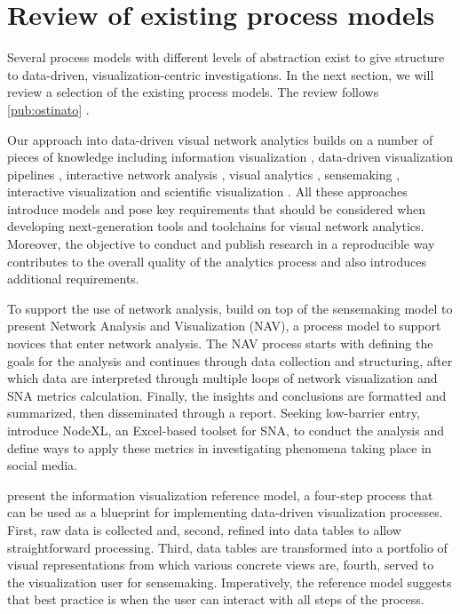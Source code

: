 \section{Review of existing process models}

Several process models with different levels of abstraction exist to give structure to data-driven, visualization-centric investigations. In the next section, we will review a selection of the existing process models. The review follows \ref{pub:ostinato} \citep{Huhtamaki2015Ostinato:Analytics}.

Our approach into data-driven visual network analytics builds on a number of pieces of knowledge including 
information visualization \citep{Card1999ReadingsThink}, 
data-driven visualization pipelines \citep{Nykanen2008}, 
interactive network analysis \citep{Hansen2012DoData},
visual analytics \citep{Wong2004VisualAnalytics},
sensemaking \citep{Pirolli2005TheAnalysis, Weick2005OrganizingSensemaking},
interactive visualization \citep{Heer2012InteractiveAnalysis} and 
scientific visualization \citep{Telea2008}. All these approaches introduce models and pose key requirements that should be considered when developing next-generation tools and toolchains for visual network analytics. Moreover, the objective to conduct and publish research in a reproducible way \citep{Peng2009,Peng2011, Ghosh2013} contributes to the overall quality of the analytics process and also introduces additional requirements.

To support the use of network analysis, \cite{Hansen2012DoData} build on top of the sensemaking model \citep{Pirolli2005TheAnalysis} to present Network Analysis and Visualization (NAV), a process model to support novices that enter network analysis. The NAV process starts with defining the goals for the analysis and continues through data collection and structuring, after which data are interpreted through multiple loops of network visualization and SNA metrics calculation. Finally, the insights and conclusions are formatted and summarized, then disseminated through a report. Seeking low-barrier entry, \cite{Hansen2011AnalyzingWorld} introduce NodeXL, an Excel-based toolset for SNA, to conduct the analysis and define ways to apply these metrics in investigating phenomena taking place in social media.

\cite{Card1999ReadingsThink} present the information visualization reference model, a four-step process that can be used as a blueprint for implementing data-driven visualization processes. First, raw data is collected and, second, refined into data tables to allow straightforward processing. Third, data tables are transformed into a portfolio of visual representations from which various concrete views are, fourth, served to the visualization user for sensemaking. Imperatively, the reference model suggests that best practice is when the user can interact with all steps of the process.

